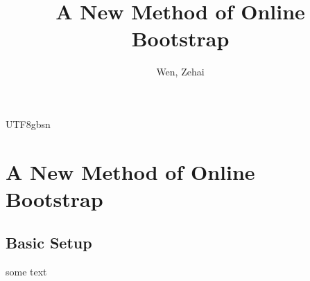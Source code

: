 \documentclass[12pt]{report}
\title{A New Method of Online Bootstrap}
\author{Wen, Zehai}
\date{\DTMnow}
\renewcommand{\bibname}{Références}
\theoremstyle{plain}
\theoremstyle{definition}
\begin{document}
\begin{CJK*}{UTF8}{gbsn}
\maketitle

\setcounter{tocdepth}{0}
\tableofcontents

\chapter{A New Method of Online Bootstrap}

\section{Basic Setup}\label{sec:basic_setup}

some text \cite{Fang_et_al_2018}


\def\bibname{References} %

\end{CJK*}
\end{document}
